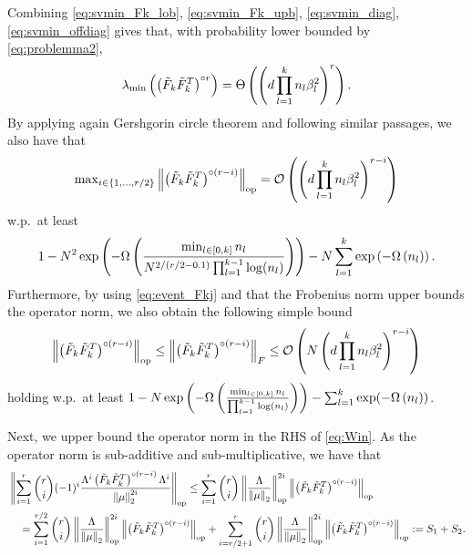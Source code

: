 \documentclass[11pt]{article}
\newcommand{\revision}[1]{#1}
\newcommand{\bigO}[1]{\mathcal{O}\left(#1\right)}
\newcommand{\bigOmg}[1]{\Omega\left(#1\right)}
\newcommand{\bigTheta}[1]{\Theta\left(#1\right)}
\newcommand{\bigexp}[1]{\exp\left(#1\right)}
\newcommand{\norm}[1]{\left\|#1\right\|}
\newcommand{\evmin}[1]{\lambda_{\rm min}\left(#1\right)}
\def\min{\mathop{\rm min}\nolimits}
\def\max{\mathop{\rm max}\nolimits}
\begin{document}
\revision{    Combining \eqref{eq:svmin_Fk_lob}, \eqref{eq:svmin_Fk_upb}, \eqref{eq:svmin_diag}, \eqref{eq:svmin_offdiag} gives that, with probability lower bounded by \eqref{eq:problemma2},
    \begin{equation}\label{eq:evmincf}
   \evmin{\left(\tilde F_{k} \tilde F_{k}^T\right)^{\circ r}} = \bigTheta{ \left( d \prod_{l=1}^{k} n_l\beta_l^2 \right)^r }. 
    \end{equation}
By applying again Gershgorin circle theorem and following similar passages, we also have that 
\begin{equation}\label{eq:bdop0}
\max_{i\in\{1, \ldots, r/2\}}   \left\|\left(\tilde F_{k} \tilde F_{k}^T\right)^{\circ (r-i)}\right\|_{\rm op} = \bigO{ \left( d \prod_{l=1}^{k} n_l\beta_l^2 \right)^{r-i} }
\end{equation}    
    w.p.\ at least 
    \begin{equation}\label{eq:problemma3}
	1 - N^2 \bigexp{ - \bigOmg{ \frac{\min_{l\in[0,k]}n_l}{N^{2/(r/2-0.1)} \prod_{l=1}^{k-1}\log(n_l)} } } - N \sum_{l=1}^{k} \bigexp{-\bigOmg{n_l}} .    
    \end{equation}
    Furthermore, by using \eqref{eq:event_Fkj} and that the Frobenius norm upper bounds the operator norm, we also obtain the following simple bound
    \begin{equation}\label{eq:bdop1}
       \left\|\left(\tilde F_{k} \tilde F_{k}^T\right)^{\circ (r-i)}\right\|_{\rm op}\le \left\|\left(\tilde F_{k} \tilde F_{k}^T\right)^{\circ (r-i)}\right\|_{F}\le  \bigO{ N\left(d \prod_{l=1}^{k} n_l\beta_l^2\right)^{r-i} } 
    \end{equation}
holding w.p.\ at least    $1-N\bigexp{ -\bigOmg{ \frac{\min_{l\in[0,k]} n_l}{\prod_{l=1}^{k-1}\log(n_l)} } } - \sum_{l=1}^{k}\exp(-\bigOmg{n_l})$.
    }
    
\revision{    Next, we upper bound the operator norm in the RHS of \eqref{eq:Win}. As the operator norm is sub-additive and sub-multiplicative, we have that
    \begin{equation}\label{eq:subsplit}
    \begin{split}
    &\left\|\sum_{i=1}^r {r \choose i}(-1)^i\frac{\Lambda^i\left(\tilde F_{k} \tilde F_{k}^T\right)^{\circ (r-i)}\Lambda^i}{\norm{\mu}_2^{2i}}\right\|_{\rm op}\le \sum_{i=1}^r {r \choose i}\left\|\frac{\Lambda}{\norm{\mu}_2}\right\|_{\rm op}^{2i}\left\|\left(\tilde F_{k} \tilde F_{k}^T\right)^{\circ (r-i)}\right\|_{\rm op}\\
    &\hspace{1em}= \sum_{i=1}^{r/2} {r \choose i}\left\|\frac{\Lambda}{\norm{\mu}_2}\right\|_{\rm op}^{2i}\left\|\left(\tilde F_{k} \tilde F_{k}^T\right)^{\circ (r-i)}\right\|_{\rm op}+\sum_{i=r/2+1}^r {r \choose i}\left\|\frac{\Lambda}{\norm{\mu}_2}\right\|_{\rm op}^{2i}\left\|\left(\tilde F_{k} \tilde F_{k}^T\right)^{\circ (r-i)}\right\|_{\rm op}:=S_1+S_2.
\end{split}   
    \end{equation}
 }
 
\end{document}
